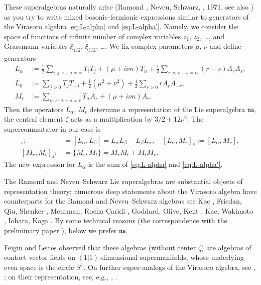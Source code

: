 \documentclass[]{amsart}
\def\ns{\mathfrak{ns}}
\begin{document}
 These superalgebras naturally arise
(Ramond \cite{Ram}, Neveu, Schwarz, \cite{NeeS}, 1971, see also \cite{IK1})
as you try to write mixed bosonic-fermionic expressions similar to generators of
the Virasoro algebra
\eqref{eq:L-alpha} and \eqref{eq:L-alpha'}.
 Namely, we  
consider the space of functions of infinite number of complex variables $z_1$, $z_2$, \dots, and Grassmann variables
$\xi_{1/2}$, $\xi_{3/2}$, \dots.
We fix complex parameters $\mu$, $\nu$ and
 define  generators 
\begin{align}
 L_\alpha&:= \frac 12 \sum_{i,j:\,i+j=\alpha} T_i T_j+ (\mu+i\nu n) T_n
 +\frac 14 \sum_{r,s:\,r+s=\alpha}(r-s) A_r A_s,
 \label{eq:fock-L}
 \\
 L_0&:=  \sum_{j>0} T_j T_{-j}+ \frac12(\mu^2+\nu^2)
+\frac 12 \sum_{r>0} r A_r A_{-r}, 
\label{eq:fock-L0}
 \\
M_r &:= \sum_{\alpha,s: \, \alpha+s=r} T_\alpha A_s+  (\mu+i\nu n)A_r . 
\label{eq:fock-M}
\end{align}
 Then the operators $L_\alpha$, $M_t$ determine a representation
of the Lie superalgebra $\ns$, the central element $\zeta$ acts as a multiplication by $3/2+12\nu^2$. The supercommutator in our case
is
\begin{align*}
[L_\alpha,L_\beta]_s:&=[L_\alpha,L_\beta]=L_\alpha L_\beta-L_\beta L_\alpha,
\quad [L_\alpha,M_r]_s:=[L_\alpha,M_r],
\\
[M_r,M_t]_s:&=\{M_r,M_t\}=M_r M_t+M_t M_r.
\end{align*}
The new expression for $L_\alpha$ is the sum of \eqref{eq:L-alpha} and \eqref{eq:L-alpha'}. 


 The Ramond and Neveu--Schwarz Lie superalgebras are substantial objects of  representation theory;
 numerous  deep      statements 
 about the Virasoro algebra have counterparts for the Ramond and Neveu--Schwarz algebras
see Kac \cite{Kac},
Friedan, Qiu, Shenker \cite{Fri},
 Meurman, Rocha-Caridi \cite{MR-C}, Goddard, Olive, Kent \cite{GOK}, Kac, Wakimoto \cite{KW}, Iohara, Koga \cite{IK1}. 
 By some technical reasons
(the correspondence with the preliminary paper  \cite{Ner-super}),  below 
we prefer $\ns$.

Feigin and Leites \cite{FL} observed that these algebras (without center $\zeta$) are algebras of contact vector fields
on $(1|1)$-dimensional supermanifolds, whose underlying even space is the circle $S^1$. On further super-analogs 
of the Virasoro algebra, 
see \cite{KvL}, \cite{GLS}; on their representation, see, e.g., \cite{IK2}, \cite{Dob}.
\end{document}
